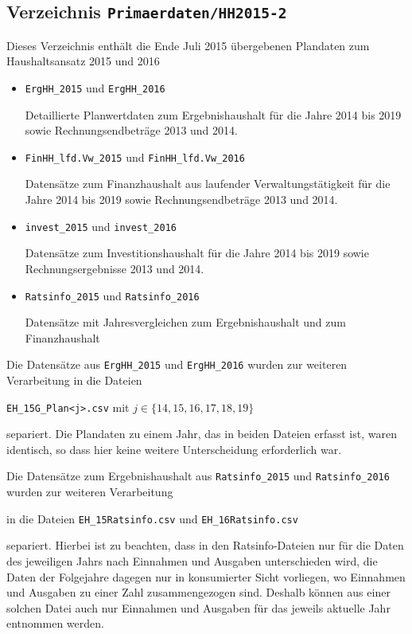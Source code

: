 \documentclass[a4paper,11pt,twoside]{article}
\begin{document}
\subsection{Verzeichnis \texttt{Primaerdaten/HH2015-2}}
Dieses Verzeichnis enthält die Ende Juli 2015 übergebenen Plandaten zum
Haushaltsansatz 2015 und 2016
\begin{itemize}
\item \texttt{ErgHH\_2015} und \texttt{ErgHH\_2016} 

Detaillierte Planwertdaten zum Ergebnishaushalt für die Jahre 2014 bis 2019
sowie Rechnungsendbeträge 2013 und 2014.
\item \texttt{FinHH\_lfd.Vw\_2015} und \texttt{FinHH\_lfd.Vw\_2016}

Datensätze zum Finanzhaushalt aus laufender Verwaltungstätigkeit für die Jahre
2014 bis 2019 sowie Rechnungsendbeträge 2013 und 2014.
\item \texttt{invest\_2015} und \texttt{invest\_2016} 

Datensätze zum Investitionshaushalt für die Jahre 2014 bis 2019 sowie
Rechnungsergebnisse 2013 und 2014.
\item \texttt{Ratsinfo\_2015} und \texttt{Ratsinfo\_2016} 

Datensätze mit Jahresvergleichen zum Ergebnishaushalt und zum Finanzhaushalt
\end{itemize}
Die Datensätze aus \texttt{ErgHH\_2015} und \texttt{ErgHH\_2016} wurden zur
weiteren Verarbeitung in die Dateien
\begin{center}
  \texttt{EH\_15G\_Plan<j>.csv} mit $j\in \{14,15,16,17,18,19\}$
\end{center}
separiert.  Die Plandaten zu einem Jahr, das in beiden Dateien erfasst ist,
waren identisch, so dass hier keine weitere Unterscheidung erforderlich war.

Die Datensätze zum Ergebnishaushalt aus \texttt{Ratsinfo\_2015} und
\texttt{Ratsinfo\_2016} wurden zur weiteren Verarbeitung
\begin{center}
  in die Dateien \texttt{EH\_15Ratsinfo.csv} und \texttt{EH\_16Ratsinfo.csv}
\end{center}
separiert.  Hierbei ist zu beachten, dass in den Ratsinfo-Dateien nur für die
Daten des jeweiligen Jahrs nach Einnahmen und Ausgaben unterschieden wird, die
Daten der Folgejahre dagegen nur in konsumierter Sicht vorliegen, wo Einnahmen
und Ausgaben zu einer Zahl zusammengezogen sind.  Deshalb können aus einer
solchen Datei auch nur Einnahmen und Ausgaben für das jeweils aktuelle Jahr
entnommen werden.
\end{document}
